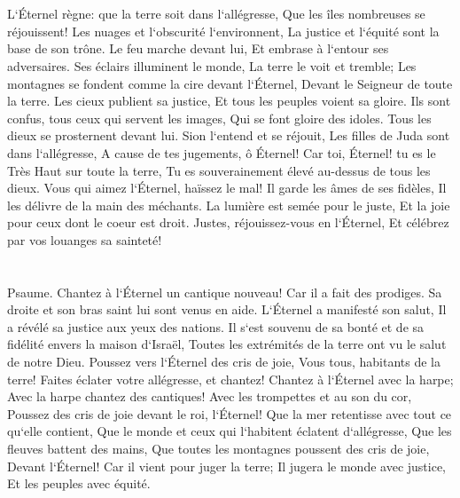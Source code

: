 \chapter{}

\verse L`Éternel règne: que la terre soit dans l`allégresse, Que les îles nombreuses se réjouissent! 
\verse Les nuages et l`obscurité l`environnent, La justice et l`équité sont la base de son trône. 
\verse Le feu marche devant lui, Et embrase à l`entour ses adversaires. 
\verse Ses éclairs illuminent le monde, La terre le voit et tremble; 
\verse Les montagnes se fondent comme la cire devant l`Éternel, Devant le Seigneur de toute la terre. 
\verse Les cieux publient sa justice, Et tous les peuples voient sa gloire. 
\verse Ils sont confus, tous ceux qui servent les images, Qui se font gloire des idoles. Tous les dieux se prosternent devant lui. 
\verse Sion l`entend et se réjouit, Les filles de Juda sont dans l`allégresse, A cause de tes jugements, ô Éternel! 
\verse Car toi, Éternel! tu es le Très Haut sur toute la terre, Tu es souverainement élevé au-dessus de tous les dieux. 
\verse Vous qui aimez l`Éternel, haïssez le mal! Il garde les âmes de ses fidèles, Il les délivre de la main des méchants. 
\verse La lumière est semée pour le juste, Et la joie pour ceux dont le coeur est droit. 
\verse Justes, réjouissez-vous en l`Éternel, Et célébrez par vos louanges sa sainteté! 

\chapter{}

\verse Psaume. Chantez à l`Éternel un cantique nouveau! Car il a fait des prodiges. Sa droite et son bras saint lui sont venus en aide. 
\verse L`Éternel a manifesté son salut, Il a révélé sa justice aux yeux des nations. 
\verse Il s`est souvenu de sa bonté et de sa fidélité envers la maison d`Israël, Toutes les extrémités de la terre ont vu le salut de notre Dieu. 
\verse Poussez vers l`Éternel des cris de joie, Vous tous, habitants de la terre! Faites éclater votre allégresse, et chantez! 
\verse Chantez à l`Éternel avec la harpe; Avec la harpe chantez des cantiques! 
\verse Avec les trompettes et au son du cor, Poussez des cris de joie devant le roi, l`Éternel! 
\verse Que la mer retentisse avec tout ce qu`elle contient, Que le monde et ceux qui l`habitent éclatent d`allégresse, 
\verse Que les fleuves battent des mains, Que toutes les montagnes poussent des cris de joie, 
\verse Devant l`Éternel! Car il vient pour juger la terre; Il jugera le monde avec justice, Et les peuples avec équité. 

